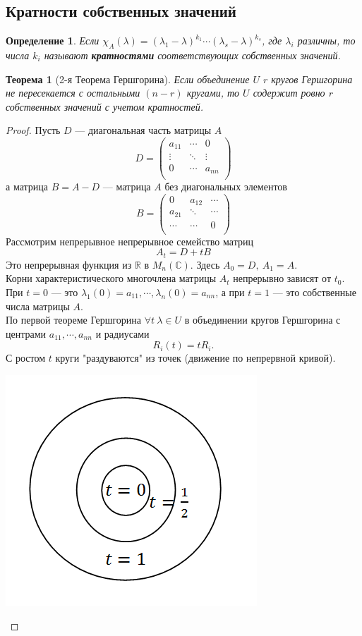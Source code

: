 \documentclass[12pt]{article}
\newtheorem*{definition}{Определение}
\newtheorem*{theorem}{Теорема}
\begin{document}
	\subsection{Кратности собственных значений}
	\begin{definition}
		Если $\chi_A(\lambda)=(\lambda_1-\lambda)^{k_1}\cdots(\lambda_s-\lambda)^{k_s}$, где $\lambda_i$ различны, то числа $k_i$ называют \textbf{кратностями} соответствующих собственных значений.
	\end{definition}
	\begin{theorem}[2-я Теорема Гершгорина] Если объединение $U$ $r$ кругов Гершгорина не пересекается с остальными $(n-r)$ кругами, то $U$ содержит ровно $r$ собственных значений с учетом кратностей.
	\end{theorem}
	\begin{proof}
	Пусть $D$ --- диагональная часть матрицы $A$
	\[D=\begin{pmatrix}
	a_{11} & \cdots & 0 \\
	\vdots & \ddots & \vdots \\
	0 & \cdots & a_{nn} \\
	\end{pmatrix}\]
	а матрица $B=A-D$ --- матрица $A$ без диагональных элементов 
	\[B=\begin{pmatrix}
	0 & a_{12} & \cdots \\
	a_{21} & \ddots & \cdots \\
	\cdots & \cdots & 0 \\
	\end{pmatrix}\]
	Рассмотрим непрерывное непрерывное семейство матриц $$A_t=D+tB$$
	Это непрерывная функция из $\mathbb{R}$ в $M_n(\mathbb{C})$. Здесь $A_0=D,~A_1=A$.\\
	Корни характеристического многочлена матрицы $A_t$ непрерывно зависят от $t_0$. При $t=0$ --- это $\lambda_1(0)=a_{11},\cdots,\lambda_n(0)=a_{nn}$, а при $t=1$ --- это собственные числа матрицы $A$.\\
	По первой теореме Гершгорина $\forall t~\lambda\in U$ в объединении кругов Гершгорина с центрами $a_{11},\cdots,a_{nn}$ и радиусами $$R_i(t)=tR_i.$$
	С ростом $t$ круги "раздуваются" из точек (движение по непрервной кривой).
	\begin{center}
		\includegraphics[scale=0.8]{l9_4.png}

\end{center}
\end{proof}
\end{document}
